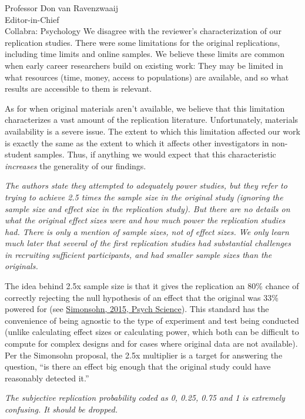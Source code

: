 \documentclass{stanfordletter}
\newcommand{\theysaid}[1]{\begin{leftbar} \noindent 
		\textsl{ #1}\end{leftbar}}
\begin{document}
\begin{letter}{Professor Don van Ravenzwaaij \\ Editor-in-Chief \\ Collabra: Psychology }
	We disagree with the reviewer's characterization of our replication studies. There were some limitations for the original replications, including time limits and online samples. We believe these limits are common when early career researchers build on existing work: They may be limited in what resources (time, money, access to populations) are available, and so what results are accessible to them is relevant. 
	
	As for when original materials aren't available, we believe that this limitation characterizes a vast amount of the replication literature. Unfortunately, materials availability is a severe issue. The extent to which this limitation affected our work is exactly the same as the extent to which it affects other investigators in non-student samples. Thus, if anything we would expect that this characteristic \emph{increases} the generality of our findings. 
	
	
	\theysaid{The authors state they attempted to adequately power studies, but they refer to trying to achieve 2.5 times the sample size in the original study (ignoring the sample size and effect size in the replication study). But there are no details on what the original effect sizes were and how much power the replication studies had. There is only a mention of sample sizes, not of effect sizes. We only learn much later that several of the first replication studies had substantial challenges in recruiting sufficient participants, and had smaller sample sizes than the originals.}
	
	The idea behind 2.5x sample size is that it gives the replication an 80\% chance of correctly rejecting the null hypothesis of an effect that the original was 33\% powered for (see \href{https://doi.org/10.1177/0956797614567341}{Simonsohn, 2015, Psych Science}). This standard has the convenience of being agnostic to the type of experiment and test being conducted (unlike calculating effect sizes or calculating power, which both can be difficult to compute for complex designs and for cases where original data are not available). Per the Simonsohn proposal, the 2.5x multiplier is a target for answering the question, ``is there an effect big enough that the original study could have reasonably detected it.''  
	
	
	\theysaid{The subjective replication probability coded as 0, 0.25, 0.75 and 1 is extremely confusing. It should be dropped.}
	

\end{letter}
\end{document}
